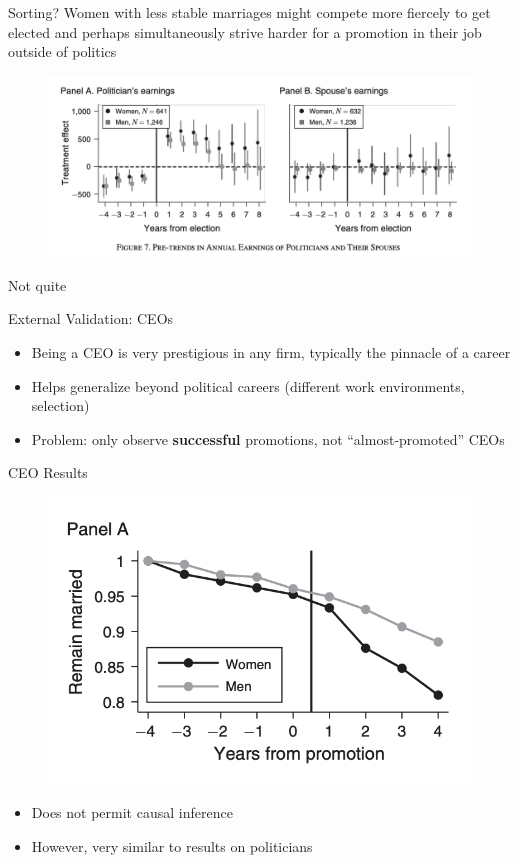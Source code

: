 \documentclass[11pt,notes=hide,aspectratio=169,mathserif]{beamer}
\begin{document}
\begin{frame}{Sorting?}
\small
Women with less stable marriages might compete more fiercely to
get elected and perhaps simultaneously strive harder for a promotion in their
job outside  of politics
\begin{figure}
\centering
\includegraphics[width=0.8\linewidth]{inputs/fig6.png}
\end{figure}
Not quite
\end{frame}


\begin{frame}{External Validation: CEOs}
\small
\begin{itemize}
  \item Being a CEO is very prestigious in any firm, typically the pinnacle of a career
  \item Helps generalize beyond political careers (different work environments, selection)
  \item Problem: only observe \textbf{successful} promotions, not “almost-promoted” CEOs
\end{itemize}
\end{frame}

\begin{frame}{CEO Results}
\small
\begin{figure}
  \centering
  \includegraphics[width=0.6\linewidth]{inputs/fig4.png}
  \end{figure}
\begin{itemize}
  \item Does not permit causal inference
  \item However, very similar to results on politicians
\end{itemize}
\end{frame}
\end{document}
